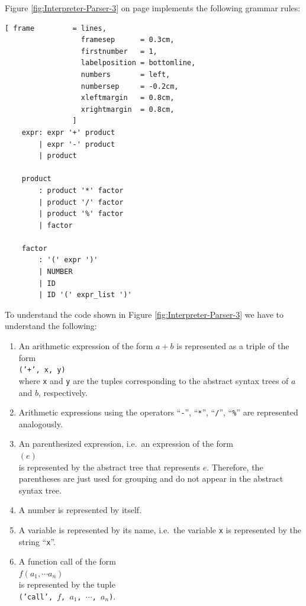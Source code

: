 Figure \ref{fig:Interpreter-Parser-3} on page \pageref{fig:Interpreter-Parser-3} implements the following
grammar rules:
\begin{Verbatim}[ frame         = lines, 
                  framesep      = 0.3cm, 
                  firstnumber   = 1,
                  labelposition = bottomline,
                  numbers       = left,
                  numbersep     = -0.2cm,
                  xleftmargin   = 0.8cm,
                  xrightmargin  = 0.8cm,
                ]
    expr: expr '+' product                 
        | expr '-' product
        | product
                  
    product
        : product '*' factor               
        | product '/' factor
        | product '%' factor 
        | factor
    
    factor
        : '(' expr ')' 
        | NUMBER
        | ID
        | ID '(' expr_list ')'
\end{Verbatim}
To understand the code shown in Figure \ref{fig:Interpreter-Parser-3} we have to understand the following:
\begin{enumerate}
\item An arithmetic expression of the form $a + b$ is represented as a triple of the form
      \\[0.2cm]
      \hspace*{1.3cm}
      \texttt{('+', x, y)}
      \\[0.2cm]
      where \texttt{x} and \texttt{y} are the tuples corresponding to the abstract syntax trees of $a$ and $b$,
      respectively. 
\item Arithmetic expressions using the operators ``\texttt{-}'', ``\texttt{*}'', ``\texttt{/}'', ``\texttt{\%}''
      are represented analogously.
\item An parenthesized expression, i.e.~an expression of the form
      \\[0.2cm]
      \hspace*{1.3cm}
      $(e)$
      \\[0.2cm]
      is represented by the abstract tree that represents $e$.  Therefore, the parentheses are just used for
      grouping and do not appear in the abstract syntax tree.
\item A number is represented by itself.
\item A variable is represented by its name, i.e.~the variable \texttt{x} is represented by the string
      ``\texttt{x}''.
\item A function call of the form
      \\[0.2cm]
      \hspace*{1.3cm}
      $f(a_1, \cdots a_n)$
      \\[0.2cm]
      is represented by the tuple
      \\[0.2cm]
      \hspace*{1.3cm}
      \texttt{('call', $f$, $a_1$, $\cdots$, $a_n$)}.
\end{enumerate}


